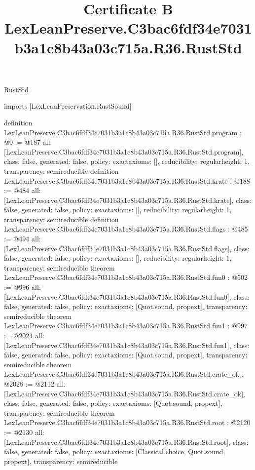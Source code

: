 \begin{lexlean}{RustStd}
\title{Certificate B LexLeanPreserve.C3bac6fdf34e7031b3a1c8b43a03c715a.R36.RustStd}
\begin{coremodule}
imports [LexLeanPreservation.RustSound]

definition LexLeanPreserve.C3bac6fdf34e7031b3a1c8b43a03c715a.R36.RustStd.program : @0 := @187 {
  all: [LexLeanPreserve.C3bac6fdf34e7031b3a1c8b43a03c715a.R36.RustStd.program],
  class: false,
  generated: false,
  policy: exact{axioms: []},
  reducibility: regular{height: 1},
  transparency: semireducible
}
definition LexLeanPreserve.C3bac6fdf34e7031b3a1c8b43a03c715a.R36.RustStd.krate : @188 := @484 {
  all: [LexLeanPreserve.C3bac6fdf34e7031b3a1c8b43a03c715a.R36.RustStd.krate],
  class: false,
  generated: false,
  policy: exact{axioms: []},
  reducibility: regular{height: 1},
  transparency: semireducible
}
definition LexLeanPreserve.C3bac6fdf34e7031b3a1c8b43a03c715a.R36.RustStd.flags : @485 := @494 {
  all: [LexLeanPreserve.C3bac6fdf34e7031b3a1c8b43a03c715a.R36.RustStd.flags],
  class: false,
  generated: false,
  policy: exact{axioms: []},
  reducibility: regular{height: 1},
  transparency: semireducible
}
theorem LexLeanPreserve.C3bac6fdf34e7031b3a1c8b43a03c715a.R36.RustStd.fun0 : @502 := @996 {
  all: [LexLeanPreserve.C3bac6fdf34e7031b3a1c8b43a03c715a.R36.RustStd.fun0],
  class: false,
  generated: false,
  policy: exact{axioms: [Quot.sound, propext]},
  transparency: semireducible
}
theorem LexLeanPreserve.C3bac6fdf34e7031b3a1c8b43a03c715a.R36.RustStd.fun1 : @997 := @2024 {
  all: [LexLeanPreserve.C3bac6fdf34e7031b3a1c8b43a03c715a.R36.RustStd.fun1],
  class: false,
  generated: false,
  policy: exact{axioms: [Quot.sound, propext]},
  transparency: semireducible
}
theorem LexLeanPreserve.C3bac6fdf34e7031b3a1c8b43a03c715a.R36.RustStd.crate_ok : @2028 := @2112 {
  all: [LexLeanPreserve.C3bac6fdf34e7031b3a1c8b43a03c715a.R36.RustStd.crate_ok],
  class: false,
  generated: false,
  policy: exact{axioms: [Quot.sound, propext]},
  transparency: semireducible
}
theorem LexLeanPreserve.C3bac6fdf34e7031b3a1c8b43a03c715a.R36.RustStd.root : @2120 := @2130 {
  all: [LexLeanPreserve.C3bac6fdf34e7031b3a1c8b43a03c715a.R36.RustStd.root],
  class: false,
  generated: false,
  policy: exact{axioms: [Classical.choice, Quot.sound, propext]},
  transparency: semireducible
}


\end{coremodule}
\end{lexlean}
